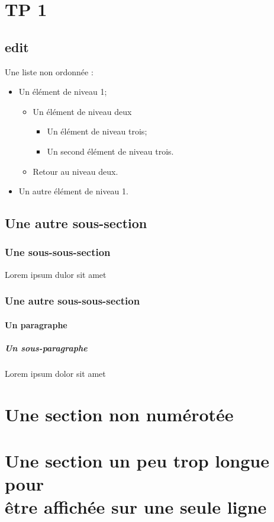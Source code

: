 \section{TP 1}

\subsection{edit}

Une liste non ordonnée :
\begin{itemize}
    \item Un élément de niveau 1;
    \begin{itemize}
        \item Un élément de niveau deux
        \begin{itemize}
            \item Un élément de niveau trois;
            \item Un second élément de niveau trois.
        \end{itemize}
        \item Retour au niveau deux.
    \end{itemize}
    \item Un autre élément de niveau 1.
\end{itemize}

\subsection{Une autre sous-section}
\subsubsection{Une sous-sous-section}
Lorem ipsum dulor sit amet
\subsubsection{Une autre sous-sous-section}
\paragraph{Un paragraphe}
\subparagraph{Un sous-paragraphe}
Lorem ipsum dolor sit amet

\section*{Une section non numérotée}

\section[Une section qui est malheureusement un peu trop longue pour être affichée sur une seule ligne]{Une section un peu trop longue pour \\ être affichée sur une seule ligne}

